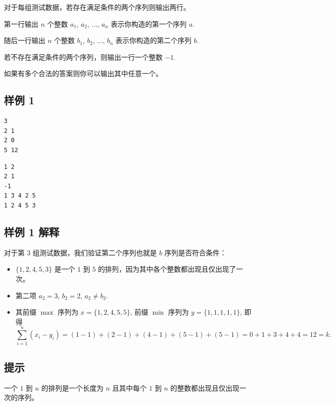 对于每组测试数据，若存在满足条件的两个序列则输出两行。

第一行输出 $n$ 个整数 $a_1$, $a_2$, $\ldots$, $a_n$ 表示你构造的第一个序列 $a$.

随后一行输出 $n$ 个整数 $b_1$, $b_2$, $\ldots$, $b_n$ 表示你构造的第二个序列 $b$.

若不存在满足条件的两个序列，则输出一行一个整数 $-1$.

如果有多个合法的答案则你可以输出其中任意一个。

\subsection{样例 1}

\begin{minipage}{\linewidth}
	\begin{minipage}[t]{0.49\linewidth}
		\begin{lstlisting}[title=\texttt{standard input}]
3
2 1
2 0
5 12
\end{lstlisting}
	\end{minipage}
	\begin{minipage}[t]{0.49\linewidth}
		\begin{lstlisting}[title=\texttt{standard output}]
1 2
2 1
-1
1 3 4 2 5 
1 2 4 5 3 
\end{lstlisting}
	\end{minipage}
\end{minipage}


\subsection{样例 1 解释}

对于第 3 组测试数据，我们验证第二个序列也就是 $b$ 序列是否符合条件：

\begin{itemize}
	\item $\{1, 2, 4, 5, 3\}$ 是一个 $1$ 到 $5$ 的排列，因为其中各个整数都出现且仅出现了一次。
	\item 第二项 $a_2 = 3$, $b_2 = 2$, $a_2 \ne b_2$.
	\item 其前缀 $\max$ 序列为 $x = \{1, 2, 4, 5, 5\}$, 前缀 $\min$ 序列为 $y = \{1, 1, 1, 1, 1\}$, 即得
	\[
		\sum_{i=1}^n (x_i - y_i) = (1 - 1) + (2 - 1) + (4 - 1) + (5 - 1) + (5 - 1) = 0 + 1 + 3 + 4 + 4 = 12 = k.
	\]
\end{itemize}

\subsection{提示}

一个 $1$ 到 $n$ 的排列是一个长度为 $n$ 且其中每个 $1$ 到 $n$ 的整数都出现且仅出现一次的序列。

